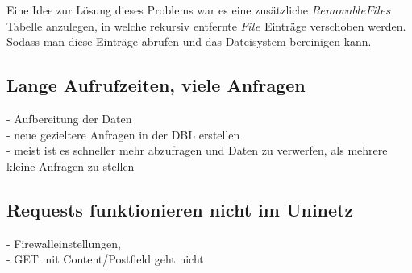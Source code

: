 Eine Idee zur Lösung dieses Problems war es eine zusätzliche $RemovableFiles$ Tabelle anzulegen, in welche rekursiv entfernte $File$ Einträge verschoben werden. Sodass man diese Einträge abrufen und das Dateisystem bereinigen kann.

\subsection{Lange Aufrufzeiten, viele Anfragen}
- Aufbereitung der Daten \\
- neue gezieltere Anfragen in der DBL erstellen \\
- meist ist es schneller mehr abzufragen und Daten zu verwerfen, als mehrere kleine Anfragen zu stellen\\

\subsection{Requests funktionieren nicht im Uninetz}
- Firewalleinstellungen, \\
- GET mit Content/Postfield geht nicht\\
